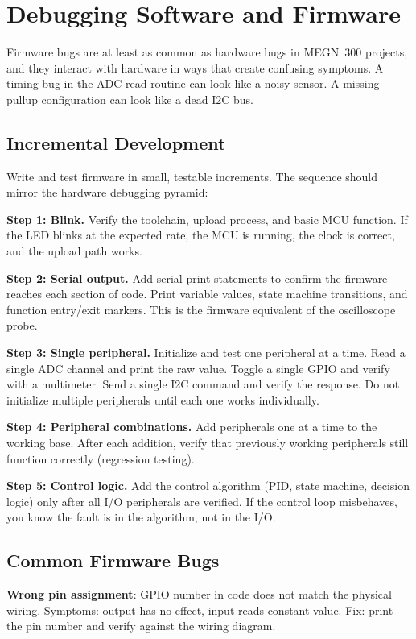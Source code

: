 \documentclass[11pt,letterpaper,twoside,openany]{book}
\begin{document}
\section{Debugging Software and Firmware}

Firmware bugs are at least as common as hardware bugs in MEGN~300 projects, and they interact with hardware in ways that create confusing symptoms. A timing bug in the ADC read routine can look like a noisy sensor. A missing pullup configuration can look like a dead I2C bus.

\subsection{Incremental Development}
Write and test firmware in small, testable increments. The sequence should mirror the hardware debugging pyramid:

\textbf{Step 1: Blink.} Verify the toolchain, upload process, and basic MCU function. If the LED blinks at the expected rate, the MCU is running, the clock is correct, and the upload path works.

\textbf{Step 2: Serial output.} Add serial print statements to confirm the firmware reaches each section of code. Print variable values, state machine transitions, and function entry/exit markers. This is the firmware equivalent of the oscilloscope probe.

\textbf{Step 3: Single peripheral.} Initialize and test one peripheral at a time. Read a single ADC channel and print the raw value. Toggle a single GPIO and verify with a multimeter. Send a single I2C command and verify the response. Do not initialize multiple peripherals until each one works individually.

\textbf{Step 4: Peripheral combinations.} Add peripherals one at a time to the working base. After each addition, verify that previously working peripherals still function correctly (regression testing).

\textbf{Step 5: Control logic.} Add the control algorithm (PID, state machine, decision logic) only after all I/O peripherals are verified. If the control loop misbehaves, you know the fault is in the algorithm, not in the I/O.

\subsection{Common Firmware Bugs}

\textbf{Wrong pin assignment}: GPIO number in code does not match the physical wiring. Symptoms: output has no effect, input reads constant value. Fix: print the pin number and verify against the wiring diagram.
\end{document}
